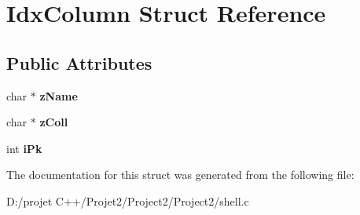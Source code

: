 \hypertarget{struct_idx_column}{}\section{Idx\+Column Struct Reference}
\label{struct_idx_column}
\subsection*{Public Attributes}
\begin{DoxyCompactItemize}
\item 
\mbox{\label{struct_idx_column_ae75b43d68736408de8261b4d8da0cf7e}} 
char $\ast$ {\bfseries z\+Name}
\item 
\mbox{\label{struct_idx_column_a3070f6f99ff28ca1e996783511299ef6}} 
char $\ast$ {\bfseries z\+Coll}
\item 
\mbox{\label{struct_idx_column_adce604e8434ec8b8734e7fcd692b3066}} 
int {\bfseries i\+Pk}
\end{DoxyCompactItemize}


The documentation for this struct was generated from the following file\+:\begin{DoxyCompactItemize}
\item 
D\+:/projet C++/\+Projet2/\+Project2/\+Project2/shell.\+c\end{DoxyCompactItemize}
